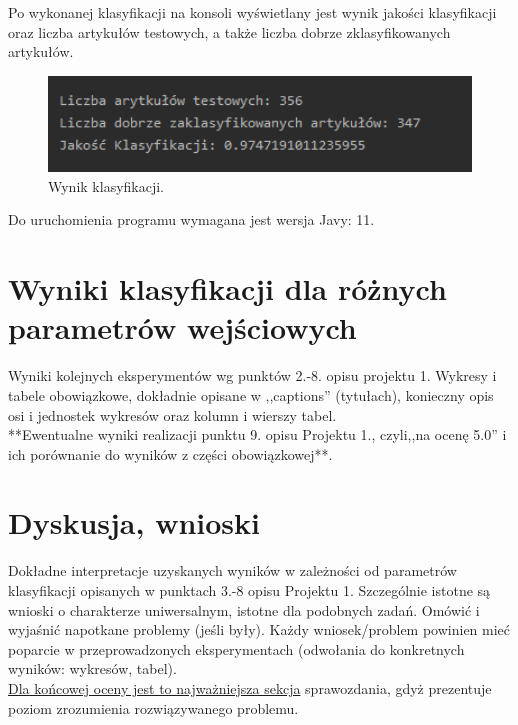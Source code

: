 \documentclass{classrep}
\begin{document}
Po wykonanej klasyfikacji na konsoli wyświetlany jest wynik jakości klasyfikacji oraz liczba artykułów testowych, a także liczba dobrze zklasyfikowanych artykułów. 
\begin{figure}[h!]
 \centering
 \includegraphics[width=14cm]{wynik.png}
 \vspace{-0.3cm}
 \caption{Wynik klasyfikacji.}
 \label{Wynik klasyfikacji.}
\end{figure}

Do uruchomienia programu wymagana jest wersja Javy: 11. 

\section{Wyniki klasyfikacji dla różnych parametrów wejściowych}
Wyniki kolejnych eksperymentów wg punktów 2.-8. opisu projektu 1.  Wykresy i tabele
obowiązkowe, dokładnie opisane w ,,captions'' (tytułach), konieczny opis osi i
jednostek wykresów oraz kolumn i wierszy tabel.\\ 

{**Ewentualne wyniki realizacji punktu 9. opisu Projektu 1., czyli,,na ocenę 5.0'' i ich porównanie do wyników z
części obowiązkowej**.}\\



\section{Dyskusja, wnioski}
Dokładne interpretacje uzyskanych wyników w zależności od parametrów klasyfikacji
opisanych w punktach 3.-8 opisu Projektu 1. 
Szczególnie istotne są wnioski o charakterze uniwersalnym, istotne dla podobnych zadań. 
Omówić i wyjaśnić napotkane problemy (jeśli były). Każdy wniosek/problem powinien mieć poparcie
w przeprowadzonych eksperymentach (odwołania do konkretnych wyników: wykresów,
tabel). \\
\underline{Dla końcowej oceny jest to najważniejsza sekcja} sprawozdania, gdyż prezentuje poziom
zrozumienia rozwiązywanego problemu.\\
\end{document}
